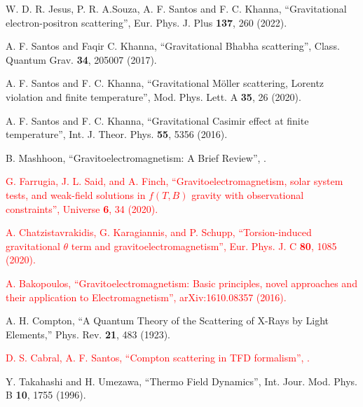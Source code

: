 \documentclass[11pt,showpacs,preprintnumbers,amsmath,amssymb,prd,nofootinbib,superscriptaddress]{revtex4-2}
\begin{document}
\begin{thebibliography}{100}
 W. D. R. Jesus, P. R. A.Souza, A. F. Santos and F. C. Khanna, ``Gravitational electron-positron scattering'', 
 {Eur. Phys. J. Plus {\bf 137}, 260 (2022).}

 A. F. Santos and Faqir C. Khanna, ``Gravitational Bhabha scattering'',  
 {Class. Quantum Grav. {\bf 34}, 205007 (2017).}

 A. F. Santos and F. C. Khanna, ``Gravitational M\"{o}ller scattering, Lorentz violation and finite temperature'',
 {Mod. Phys. Lett. A {\bf 35}, 26 (2020).}

 A. F. Santos and F. C. Khanna, ``Gravitational Casimir effect at finite temperature'',
 {Int. J. Theor. Phys. {\bf 55}, 5356 (2016).}

 B. Mashhoon, ``Gravitoelectromagnetism: A Brief Review'', 
.

\textcolor{red}{ G. Farrugia, J. L. Said, and A. Finch, ``Gravitoelectromagnetism, solar system tests, and weak-field solutions in $f(T,B)$ gravity with observational constraints'',  {Universe {\bf 6}, 34 (2020).}}

\textcolor{red}{ A. Chatzistavrakidis, G. Karagiannis, and P. Schupp, ``Torsion-induced gravitational $\theta$ term and gravitoelectromagnetism'',  {Eur. Phys. J. C {\bf 80}, 1085 (2020).}}

\textcolor{red}{ A. Bakopoulos, ``Gravitoelectromagnetism: Basic principles, novel approaches and their application to Electromagnetism'',  {arXiv:1610.08357 (2016).}}


 A. H. Compton, ``A Quantum Theory of the Scattering of X-Rays by Light Elements,''
 {Phys. Rev. {\bf 21}, 483 (1923).}

\textcolor{red}{ D. S. Cabral, A. F. Santos, ``Compton scattering in TFD formalism'', .}

Y. Takahashi and H. Umezawa, ``Thermo Field Dynamics'', 
 {Int. Jour. Mod. Phys. B {\bf 10}, 1755 (1996).}


\end{thebibliography}
\end{document}
